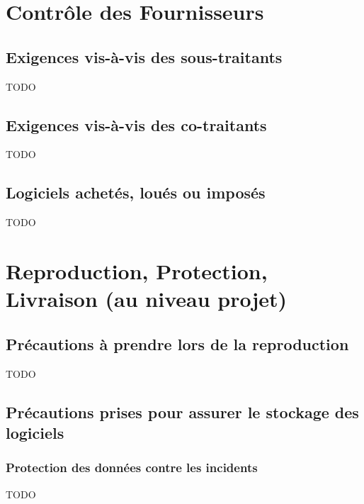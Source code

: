 \section{Contrôle des Fournisseurs}
  \subsection{Exigences vis-à-vis des sous-traitants}
    \begin{center} \begin{Large}TODO\end{Large}  \end{center}
  \subsection{Exigences vis-à-vis des co-traitants}
    \begin{center} \begin{Large}TODO\end{Large}  \end{center}
  \subsection{Logiciels achetés, loués ou imposés}
    \begin{center} \begin{Large}TODO\end{Large}  \end{center}

\section{Reproduction, Protection, Livraison (au niveau projet)}
  \subsection{Précautions à prendre lors de la reproduction}
      \begin{center} \begin{Large}TODO\end{Large}  \end{center}
  \subsection{Précautions prises pour assurer le stockage des logiciels}
    \subsubsection{Protection des données contre les incidents}
        \begin{center} \begin{Large}TODO\end{Large}  \end{center}
